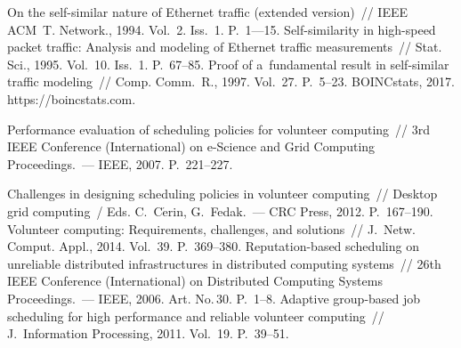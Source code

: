 




 \begin{multicols}{2}

\renewcommand{\bibname}{\protect\rmfamily Литература}

{\small\frenchspacing
{\baselineskip=10.5pt
\begin{thebibliography}{99}


On the self-similar nature of Ethernet traffic (extended version)~// 
IEEE ACM~T. Network., 1994. Vol.~2. Iss.~1. P.~1---15.
 Self-similarity in high-speed packet traffic: Analysis and modeling of Ethernet 
 traffic measurements~// Stat. Sci., 1995. Vol.~10. Iss.~1. P.~67--85.
Proof of a~fundamental result in self-similar traffic modeling~// 
Comp. Comm.~R., 1997. Vol.~27. P.~5--23.
 BOINCstats, 2017. {\sf https://boincstats.com}.

Performance evaluation of scheduling policies for volunteer computing~// 
3rd IEEE  Conference (International) 
on e-Science and Grid Computing Proceedings.~--- IEEE, 2007. P.~221--227.

Challenges in designing scheduling policies in volunteer computing~// 
Desktop grid computing~/ Eds. C.~C$\acute{\mbox{e}}$rin, G.~Fedak.~--- 
CRC Press, 2012. P.~167--190.
Volunteer computing: Requirements, challenges, and solutions~// 
J.~Netw. Comput. Appl., 2014. Vol.~39. P.~369--380.
 Reputation-based scheduling on unreliable distributed infrastructures in 
 distributed computing systems~// 26th IEEE Conference (International)
 on Distributed Computing Systems Proceedings.~--- IEEE, 2006. Art. No.\,30. P.~1--8.
Adaptive group-based job scheduling for high performance and reliable volunteer 
computing~// J.~Information Processing, 2011. Vol.~19. P.~39--51.


\end{thebibliography}}}
\end{multicols}
